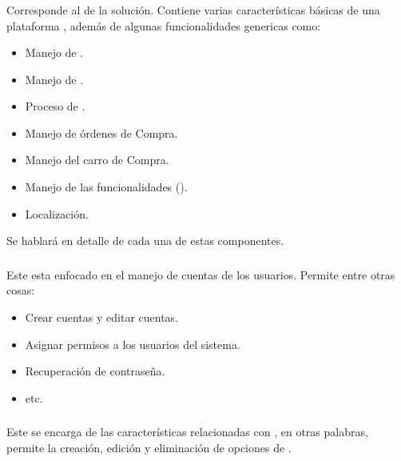 		\subsubsection{\eframeworkCorePCKG}

			Corresponde al \coreAS de la solución. Contiene varias características básicas de una plataforma \ecommerceCOM, además de  algunas funcionalidades genericas como:

			\begin{itemize}
				\item
					Manejo de \itemsCOM.
				\item
					Manejo de \sessionsINT. 
				\item
					Proceso de \checkoutCOM.
				\item
					Manejo de órdenes de Compra.
				\item
					Manejo del carro de Compra.	
				\item
					Manejo de las funcionalidades (\dashboardEF).
				\item
					Localización.
			\end{itemize}

			Se hablará en detalle de cada una de estas componentes.

		\subsubsection{\eframeworkAccountsPCKG}

			Este \packagesAS  esta enfocado en el manejo de cuentas de los usuarios. Permite entre otras cosas:

			\begin{itemize}
				\item
					Crear cuentas y editar cuentas.
				\item
					Asignar permisos a los usuarios del sistema.
				\item
					Recuperación de contraseña.
				\item
					etc.
			\end{itemize}

		\subsubsection{\eframeworkShippingPCKG}
			Este \packagesAS se encarga de las características relacionadas con \ShippingCOM, en otras palabras, permite la creación, edición y eliminación de opciones de \ShippingCOM.

